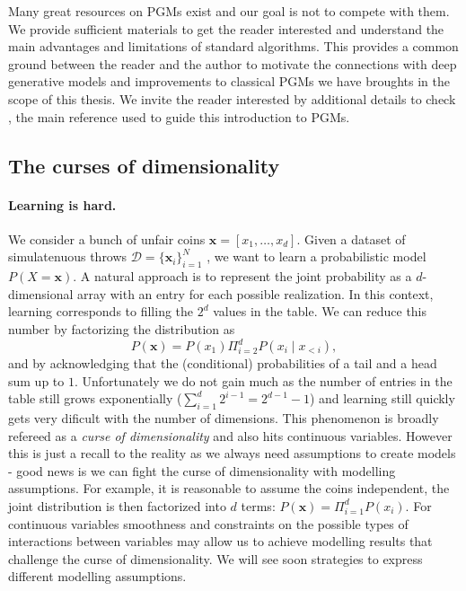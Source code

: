 Many great resources on PGMs exist and our goal is not to compete with them. We provide sufficient materials to get the reader interested and understand the main advantages and limitations of standard algorithms. This provides a common ground between the reader and the author to motivate the connections with deep generative models and improvements to classical PGMs we have broughts in the scope of this thesis. We invite the reader interested by additional details to check \citet{}, the main reference used to guide this introduction to PGMs.

\subsection{The curses of dimensionality}
\paragraph{Learning is hard.} We consider a bunch of unfair coins $\bm{x} = \left[x_1, \dots, x_d \right]$. Given a dataset of simulatenuous throws $\mathcal{D} = \{\bm{x}_i\}_{i=1}^N$ , we want to learn a probabilistic model $P(X=\bm{x})$. A natural approach is to represent the joint probability as a $d$-dimensional array with an entry for each possible realization. In this context, learning corresponds to filling the $2^d$ values in the table. We can reduce this number by factorizing the distribution as
$$P(\bm{x}) = P(x_1)\Pi_{i=2}^d P(x_i\mid x_{<i}),$$ and by acknowledging that the (conditional) probabilities of a tail and a head sum up to $1$. Unfortunately we do not gain much as the number of entries in the table still grows exponentially ($\sum_{i=1}^d 2^{i-1} = 2^{d-1} - 1$) and learning still quickly gets very dificult with the number of dimensions. This phenomenon is broadly refereed as a \textit{curse of dimensionality} and also hits continuous variables. However this is just a recall to the reality as we always need assumptions to create models - good news is we can fight the curse of dimensionality with modelling assumptions. For example, it is reasonable to assume the coins independent, the joint distribution is then factorized into $d$ terms: $ P(\bm{x}) = \Pi_{i=1}^d P(x_i)$. For continuous variables smoothness and constraints on the possible types of interactions between variables may allow us to achieve modelling results that challenge the curse of dimensionality. We will see soon strategies to express different modelling assumptions.

